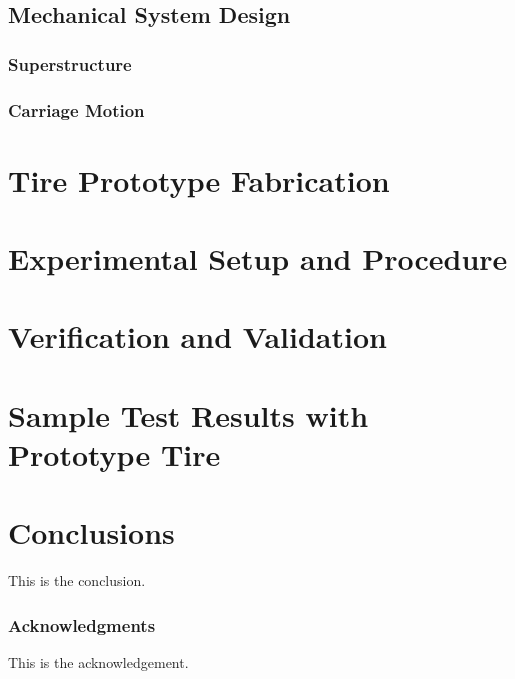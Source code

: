 \documentclass{article}
\begin{document}
\subsection{Mechanical System Design}


\subsubsection{Superstructure}


\subsubsection{Carriage Motion}
\label{subsubsec:carriage-motion}



\section{Tire Prototype Fabrication}
\label{sec:tire-prototyoe-fabrication}

\section{Experimental Setup and Procedure}


\section{Verification and Validation}


\section{Sample Test Results with Prototype Tire}

\section{Conclusions}

This is the conclusion.

\subsubsection*{Acknowledgments}
This is the acknowledgement.



\end{document}
